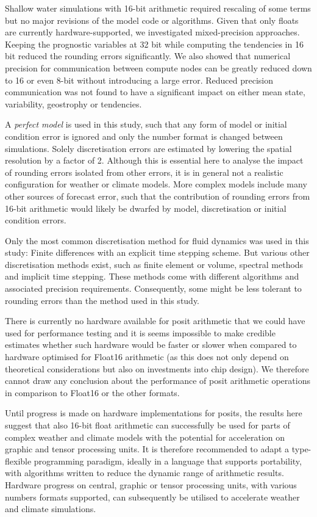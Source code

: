 Shallow water simulations with 16-bit arithmetic required rescaling of some terms but no major revisions of the model code
or algorithms. Given that only floats are currently hardware-supported, we investigated mixed-precision approaches.
Keeping the prognostic variables at 32 bit while computing the tendencies in 16 bit reduced the rounding errors significantly.
We also showed that numerical precision for communication between compute nodes can be greatly reduced down to 16 or
even 8-bit without introducing a large error. Reduced precision communication was not found to have a significant impact on
either mean state, variability, geostrophy or tendencies.

A \emph{perfect model} is used in this study, such that any form of model or initial condition error is ignored and only the number
format is changed between simulations. Solely discretisation errors are estimated by lowering the spatial resolution by a factor of 2.
Although this is essential here to analyse the impact of rounding errors isolated from other errors, it is in general not a realistic
configuration for weather or climate models. More complex models include many other sources of forecast error, such that the
contribution of rounding errors from 16-bit arithmetic would likely be dwarfed by model, discretisation or initial condition errors.

Only the most common discretisation method for fluid dynamics was used in this study: Finite differences with an explicit time
stepping scheme. But various other discretisation methods exist, such as finite element or volume, spectral methods and
implicit time stepping. These methods come with different algorithms and associated precision requirements. Consequently,
some might be less tolerant to rounding errors than the method used in this study.

There is currently no hardware available for posit arithmetic that we could have used for performance testing and it is seems
impossible to make credible estimates whether such hardware would be faster or slower when compared to hardware optimised
for Float16 arithmetic (as this does not only depend on theoretical considerations but also on investments into chip design).
We therefore cannot draw any conclusion about the performance of posit arithmetic operations in comparison to Float16 or
the other formats.

Until progress is made on hardware implementations for posits, the results here suggest that also 16-bit float arithmetic can
successfully be used for parts of complex weather and climate models with the potential for acceleration on graphic and tensor
processing units. It is therefore recommended to adapt a type-flexible programming paradigm, ideally in a language that supports
portability, with algorithms written to reduce the dynamic range of arithmetic results. Hardware progress on central, graphic or
tensor processing units, with various numbers formats supported, can subsequently be utilised to accelerate weather and
climate simulations.
